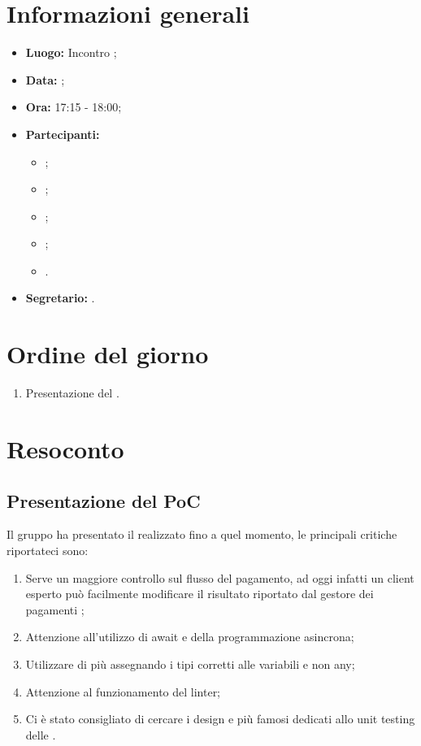 \section{Informazioni generali}
\begin{itemize}
\item \textbf{Luogo:} Incontro ;
\item \textbf{Data:} \Data;
\item \textbf{Ora:} 17:15 - 18:00;
\item \textbf{Partecipanti:}
	\begin{itemize}
		\item \BL{}; 
		\item \FF{};
		\item \MM{};
		\item \TG{};
		\item \Proponente{}.
	\end{itemize}
\item \textbf{Segretario:} \TG{}.
\end{itemize}

\section{Ordine del giorno}
\begin{enumerate}
	\item Presentazione del .
\end{enumerate}

\section{Resoconto}
\subsection{Presentazione del PoC}
Il gruppo ha presentato il  realizzato fino a quel momento, le principali critiche riportateci sono:
\begin{enumerate}
	\item Serve un maggiore controllo sul flusso del pagamento, ad oggi infatti un client esperto può facilmente modificare il risultato riportato dal gestore dei pagamenti ;
	\item Attenzione all'utilizzo di await e della programmazione asincrona;
	\item Utilizzare di più  assegnando i tipi corretti alle variabili e non any;
	\item Attenzione al funzionamento del linter;
	\item Ci è stato consigliato di cercare i design  e  più famosi dedicati allo unit testing delle .
\end{enumerate}

